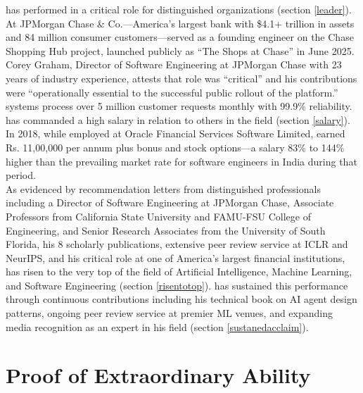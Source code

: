 \documentclass[11pt]{article}
\begin{document}
\dr has performed in a critical role for distinguished organizations (section \ref{leader}). At JPMorgan Chase \& Co.---America's largest bank with \$4.1+ trillion in assets and 84 million consumer customers---\dr served as a founding engineer on the Chase Shopping Hub project, launched publicly as ``The Shops at Chase'' in June 2025. Corey Graham, Director of Software Engineering at JPMorgan Chase with 23 years of industry experience, attests that \drs role was ``critical'' and his contributions were ``operationally essential to the successful public rollout of the platform.'' \drs systems process over 5 million customer requests monthly with 99.9\% reliability.\\

\dr has commanded a high salary in relation to others in the field (section \ref{salary}). In 2018, while employed at Oracle Financial Services Software Limited, \dr earned Rs. 11,00,000 per annum plus bonus and stock options---a salary 83\% to 144\% higher than the prevailing market rate for software engineers in India during that period.\\

As evidenced by recommendation letters from distinguished professionals including a Director of Software Engineering at JPMorgan Chase, Associate Professors from California State University and FAMU-FSU College of Engineering, and Senior Research Associates from the University of South Florida, his 8 scholarly publications, extensive peer review service at ICLR and NeurIPS, and his critical role at one of America's largest financial institutions, \dr has risen to the very top of the field of Artificial Intelligence, Machine Learning, and Software Engineering (section \ref{risentotop}). \dr has sustained this performance through continuous contributions including his technical book on AI agent design patterns, ongoing peer review service at premier ML venues, and expanding media recognition as an expert in his field (section \ref{sustanedacclaim}). 


\section{Proof of \drs Extraordinary Ability}


%
\end{document}
